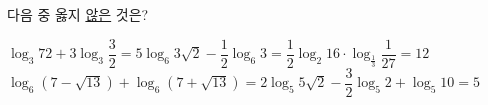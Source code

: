 다음 중 옳지 \underline{않은} 것은?
\begin{choicesv}{$\log_3 72+3\log_3 \dfrac{3}{2}=5$}{$\log_6 3\sqrt{2}-\dfrac{1}{2}\log_6 3=\dfrac{1}{2}$}{$\log_2 16\cdot\log_{\frac{1}{3}} \dfrac{1}{27}=12$}{$\log_6(7-\sqrt{13})+\log_6(7+\sqrt{13})=2$}{$\log_5 5\sqrt{2}-\dfrac{3}{2}\log_5 2+\log_5 10=5$}\end{choicesv}
